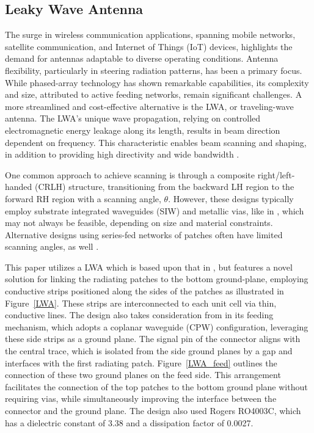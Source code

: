\documentclass[conference]{IEEEtran}
\begin{document}
\subsection{Leaky Wave Antenna}
The surge in wireless communication applications, spanning mobile networks, satellite communication, and Internet of Things (IoT) devices, highlights the demand for antennas adaptable to diverse operating conditions. Antenna flexibility, particularly in steering radiation patterns, has been a primary focus. While phased-array technology has shown remarkable capabilities, its complexity and size, attributed to active feeding networks, remain significant challenges. A more streamlined and cost-effective alternative is the LWA, or traveling-wave antenna. The LWA's unique wave propagation, relying on controlled electromagnetic energy leakage along its length, results in beam direction dependent on frequency. This characteristic enables beam scanning and shaping, in addition to providing high directivity and wide bandwidth \cite{LWA}. 

One common approach to achieve scanning is through a composite right/left-handed (CRLH) structure, transitioning from the backward LH region to the forward RH region with a scanning angle, \(\theta\). However, these designs typically employ substrate integrated waveguides (SIW) and metallic vias, like in \cite{crlh_siw_lwa,circular_lwa,SIW,CRLH_multivia}, which may not always be feasible, depending on size and material constraints. Alternative designs using series-fed networks of patches often have limited scanning angles, as well \cite{sfp_lwa}. 

This paper utilizes a LWA which is based upon that in \cite{CRLH_multivia}, but features a novel solution for linking the radiating patches to the bottom ground-plane, employing conductive strips positioned along the sides of the patches as illustrated in Figure~\ref{LWA}. These strips are interconnected to each unit cell via thin, conductive lines. The design also takes consideration from \cite{cpw_lwa} in its feeding mechanism, which adopts a coplanar waveguide (CPW) configuration, leveraging these side strips as a ground plane. The signal pin of the connector aligns with the central trace, which is isolated from the side ground planes by a gap and interfaces with the first radiating patch. Figure~\ref{LWA_feed} outlines the connection of these two ground planes on the feed side. This arrangement facilitates the connection of the top patches to the bottom ground plane without requiring vias, while simultaneously improving the interface between the connector and the ground plane. The design also used Rogers RO4003C, which has a dielectric constant of 3.38 and a dissipation factor of 0.0027. 
\end{document}
